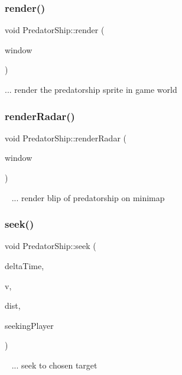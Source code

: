\subsubsection{\texorpdfstring{render()}{render()}}
{\footnotesize\ttfamily void Predator\+Ship\+::render (\begin{DoxyParamCaption}\item[{sf\+::\+Render\+Window \&}]{window }\end{DoxyParamCaption})}

... render the predatorship sprite in game world\mbox{\label{class_predator_ship_a4f32416e9d9175ec61bab70008ad709f}} 
\subsubsection{\texorpdfstring{render\+Radar()}{renderRadar()}}
{\footnotesize\ttfamily void Predator\+Ship\+::render\+Radar (\begin{DoxyParamCaption}\item[{sf\+::\+Render\+Window \&}]{window }\end{DoxyParamCaption})}

~\newline
... render blip of predatorship on minimap\mbox{\label{class_predator_ship_a941925b4c228dcbb9fae0d8f9ee8af24}} 
\subsubsection{\texorpdfstring{seek()}{seek()}}
{\footnotesize\ttfamily void Predator\+Ship\+::seek (\begin{DoxyParamCaption}\item[{float}]{delta\+Time,  }\item[{sf\+::\+Vector2f}]{v,  }\item[{float}]{dist,  }\item[{bool}]{seeking\+Player }\end{DoxyParamCaption})}

~\newline
... seek to chosen target\mbox{\label{class_predator_ship_a68003be2e0126853481903bccb5473ed}} 
